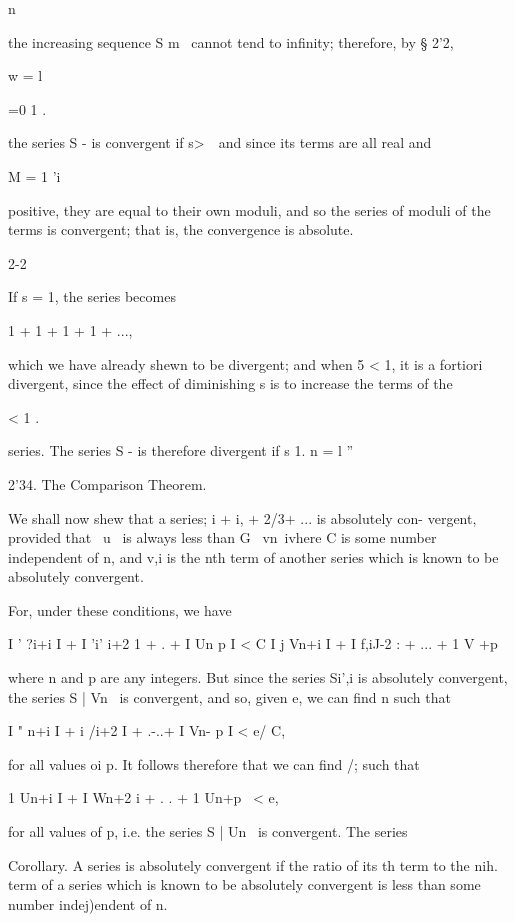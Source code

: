 n

the increasing sequence S m~ cannot tend to infinity; therefore, by §
2'2,

w = l

=0 1 .

the series S - is convergent if s>\ \ and since its terms are all real
and

M = 1 'i

positive, they are equal to their own moduli, and so the series of
moduli of the terms is convergent; that is, the convergence is
absolute.

2-2

%
%

If s = 1, the series becomes

1 + 1 + 1 + 1 + ...,

which we have already shewn to be divergent; and when 5 < 1, it is a
fortiori divergent, since the effect of diminishing s is to increase
the terms of the

< 1 .

series. The series S - is therefore divergent if s 1. n = l ''

2'34. The Comparison Theorem.

We shall now shew that a series; i + i, + 2/3+ ... is absolutely
con- vergent, provided that \ u \ is always less than G \ vn\, ivhere
C is some number independent of n, and v,i is the nth term of another
series which is known to be absolutely convergent.

For, under these conditions, we have

I ' ?i+i I + I 'i' i+2 1 +  .  + I Un p I < C I j Vn+i I + I f,iJ-2
: + ... + 1 V +p \ \,

where n and p are any integers. But since the series Si',i is
absolutely convergent, the series S | Vn \ is convergent, and so,
given e, we can find n such that

I " n+i I + i /i+2 I + .-..+ I Vn- p I < e/ C,

for all values oi p. It follows therefore that we can find /; such
that

1 Un+i I + I Wn+2 i + . . + 1 Un+p \ < e,

for all values of p, i.e. the series S | Un \ is convergent. The
series %

Corollary. A series is absolutely convergent if the ratio of its th
term to the nih. term of a series which is known to be absolutely
convergent is less than some number indej)endent of n.

